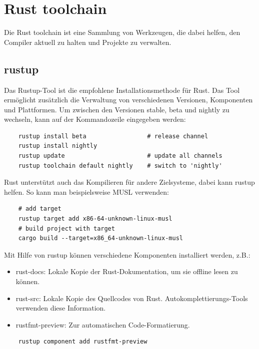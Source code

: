 \chapter{Rust toolchain}

Die Rust toolchain ist eine Sammlung von Werkzeugen, die dabei helfen, den Compiler aktuell zu halten und Projekte zu verwalten.


\section{rustup}

Das Rustup-Tool ist die empfohlene Installationsmethode für Rust. Das Tool ermöglicht zusätzlich die Verwaltung von verschiedenen Versionen, Komponenten und Plattformen. Um zwischen den Versionen stable, beta und nightly zu wechseln, kann auf der Kommandozeile eingegeben werden:

\begin{lstlisting}   
    rustup install beta                 # release channel
    rustup install nightly
    rustup update                       # update all channels
    rustup toolchain default nightly    # switch to 'nightly'
\end{lstlisting}

Rust unterstützt auch das Kompilieren für andere Zielsysteme, dabei kann rustup helfen. So kann man beispielsweise MUSL verwenden:

\begin{lstlisting}
    # add target
    rustup target add x86-64-unknown-linux-musl
    # build project with target
    cargo build --target=x86_64-unknown-linux-musl
\end{lstlisting}

Mit Hilfe von rustup können verschiedene Komponenten installiert werden, z.B.:

\begin{itemize}
    \item rust-docs: Lokale Kopie der Rust-Dokumentation, um sie offline lesen zu können.
    \item rust-src: Lokale Kopie des Quellcodes von Rust. Autokomplettierungs-Tools verwenden diese Information.
    \item rustfmt-preview: Zur automatischen Code-Formatierung.
\end{itemize}

\begin{lstlisting}
    rustup component add rustfmt-preview
\end{lstlisting}


